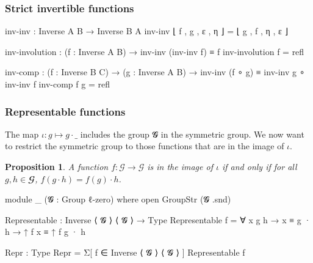 \documentclass[presentation]{beamer}
\newtheorem{prop}[theorem]{Proposition}
\begin{document}
\begin{frame}
  \frametitle{Strict invertible functions}
  \begin{code}
      inv-inv : Inverse A B → Inverse B A
      inv-inv ⌊ f , g , ε , η ⌋ = ⌊ g , f , η , ε ⌋

      inv-involution :  (f : Inverse A B)
                     →  inv-inv (inv-inv f) ≡ f
      inv-involution f = refl

      inv-comp :  (f : Inverse B C)
               →  (g : Inverse A B)
               →  inv-inv (f ∘ g) ≡ inv-inv g ∘ inv-inv f
      inv-comp f g = refl
  \end{code}
\end{frame}

\begin{frame}
  \frametitle{Representable functions}
  The map \(\iota : g \mapsto g \cdot \_\) includes the group 𝓖 in the symmetric group. We now want to restrict the symmetric group to those functions that are in the image of \(\iota\).

  \begin{prop}
    A function \(f : \mathcal{G} → \mathcal{G}\) is in the image of \(\iota\) if and only if for all \(g,h \in 𝓖\), \(f (g \cdot h) = f (g) \cdot h\).
  \end{prop}

  \pause

  \begin{code}[hide]
      module _ (𝓖 : Group ℓ-zero) where
        open GroupStr (𝓖 .snd)
  \end{code}
  \begin{code}
        Representable : Inverse ⟨ 𝓖 ⟩ ⟨ 𝓖 ⟩ → Type
        Representable f = ∀ x g h → x ≡ g · h → ↑ f x ≡ ↑ f g · h

        Repr : Type
        Repr = Σ[ f ∈ Inverse ⟨ 𝓖 ⟩ ⟨ 𝓖 ⟩ ] Representable f
  \end{code}
\end{frame}
\end{document}
